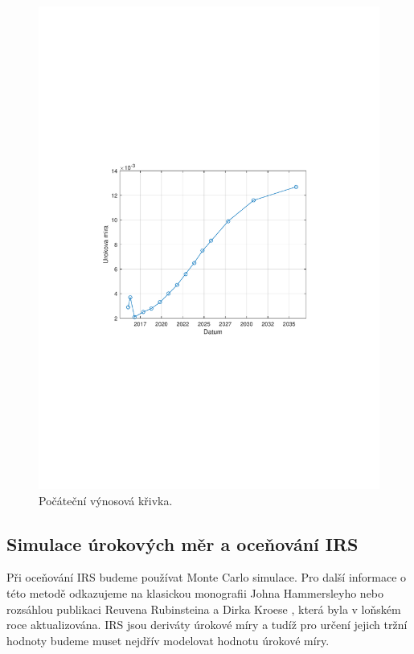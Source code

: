 \documentclass[a4paper,12pt]{report}
\theoremstyle{definition} \newtheorem{definice}[veta]{Definice}
\theoremstyle{remark}
\begin{document}
\begin{figure}[!htbp]
  \centering 
	\includegraphics[width=13cm, clip, trim= 110 260 110 270]{IMG/Vynosova_krivka.pdf}
  \caption{Počáteční výnosová křivka.}  \label{YieldCurve}
\end{figure}

\subsection{Simulace úrokových měr a oceňování IRS}\label{simulace_kap}
Při oceňování IRS budeme používat Monte Carlo simulace.
Pro další informace o této metodě odkazujeme na klasickou monografii Johna Hammersleyho \cite{hammersley2013monte} nebo rozsáhlou publikaci Reuvena Rubinsteina a Dirka Kroese \cite{rubinstein2016simulation}, která byla v loňském roce aktualizována.
IRS jsou deriváty úrokové míry a tudíž pro určení jejich tržní hodnoty budeme muset nejdřív modelovat hodnotu úrokové míry.
\end{document}
